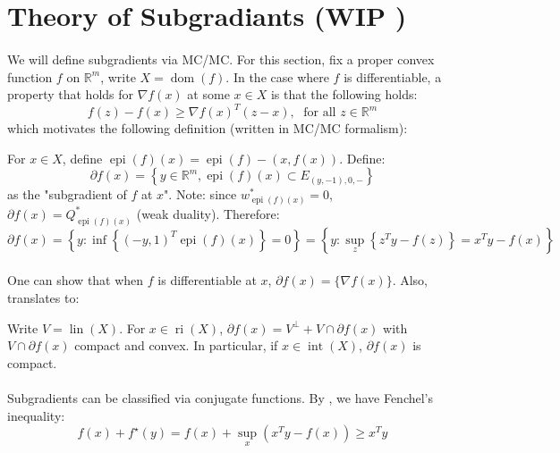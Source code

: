 \section{Theory of Subgradiants (WIP \faWrench)}
\label{sect:045}

\paragraph{}We will define subgradients via MC/MC. For this section, fix a proper convex function $f$ on $\mathbb{R}^m$, write $X=\operatorname{dom}(f)$. In the case where $f$ is differentiable, a property that holds for $\nabla f(x)$ at some $x\in X$ is that the following holds:
\[
	f(z)-f(x)\geq \nabla f(x)^T(z-x),\; \text{ for all }z\in \mathbb{R}^m
\]
which motivates the following definition (written in MC/MC formalism):

\begin{defn}[Subgradients]\label{defn-subgradients}
	For $x\in X$, define $\operatorname{epi}(f)(x) = \operatorname{epi}(f) - (x,f(x))$. Define:
	\[
		\partial f(x) = \left\{
		y\in \mathbb{R}^m,
		\operatorname{epi}(f)(x)\subset E_{(y,-1),0,-}
		\right\}
	\]
	as the "subgradient of $f$ at $x$". Note: since $w^\ast_{\operatorname{epi}(f)(x)}=0$, $\partial f(x)=Q^\ast_{\operatorname{epi}(f)(x)}$ (weak duality). Therefore:
	\[
		\partial f(x) = \left\{y:\inf\left\{(-y,1)^T \operatorname{epi}(f)(x)\right\}=0\right\}=\left\{y:\sup_z \left\{ z^Ty-f(z)\right\}=x^Ty-f(x)\right\}
	\]
\end{defn}

\paragraph{}One can show that when $f$ is differentiable at $x$, $\partial f(x)=\{\nabla f(x)\}$. Also,  translates to:

\begin{prop}\label{prop:045-set-of-subgrad}
	Write $V=\operatorname{lin}(X)$. For $x\in \operatorname{ri}(X)$, $\partial f(x) = V^\perp + V\cap \partial f(x)$ with $V\cap \partial f(x)$ compact and convex. In particular, if $x\in \operatorname{int}(X)$, $\partial f(x)$ is compact.
\end{prop}

\paragraph{}Subgradients can be classified via conjugate functions. By , we have Fenchel's inequality:
\[
	f(x) + f^\star(y) = f(x) + \sup_{x}(x^Ty-f(x)) \geq x^Ty
\]

